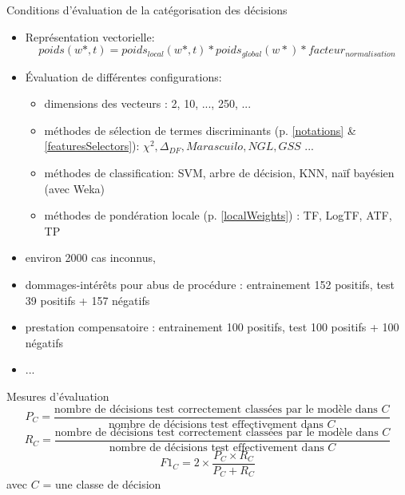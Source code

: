 \documentclass[newPxFont,pagenumber]{beamer}
\begin{document}
\begin{frame}{Conditions d'évaluation de la catégorisation des décisions}

\begin{itemize}
\item Représentation vectorielle: {\small \[ poids(w*, t) = poids_{local}(w*, t) * poids_{global}(w*) * facteur_{normalisation}\]}
\item Évaluation de différentes configurations:
\begin{itemize}
\item dimensions des vecteurs : 2, 10, ..., 250, ...
\item méthodes de sélection de termes discriminants (p. \ref{notations} \& \ref{featuresSelectors}): $\chi^2, \Delta_{DF}, Marascuilo, NGL, GSS $  ...
\item méthodes de classification: SVM, arbre de décision, KNN, naïf bayésien (avec Weka\cite{Eibe2016Weka})
\item méthodes de pondération locale (p. \ref{localWeights}) : TF, LogTF, ATF, TP
\end{itemize}
\item environ 2000 cas inconnus, 
\item dommages-intérêts pour abus de procédure : entrainement 152 positifs, test 39 positifs + 157 négatifs
\item prestation compensatoire : entrainement 100 positifs, test 100 positifs + 100 négatifs
\item ...
\end{itemize}
\end{frame}

\begin{frame}{Mesures d'évaluation}
\scriptsize
\[ P_C = \frac{\text{nombre de décisions test correctement classées par le modèle dans } C}{\text{nombre de décisions test effectivement dans } C} \]
\[ R_C = \frac{\text{nombre de décisions test correctement classées par le modèle dans } C}{\text{nombre de décisions test effectivement dans } C} \]
\[ F1_C = 2 \times \frac{P_C \times R_C }{P_C + R_C} \]
avec $C$ = une classe de décision

\end{frame}
\end{document}

